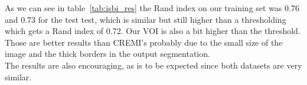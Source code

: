 As we can see in table~\ref{tab:isbi_res} the Rand index on our training set was 0.76 and 0.73 for the test test, 
which is similar but still higher than a thresholding which gets a Rand index of 0.72.
Our VOI is also a bit higher than the threshold.\\
Those are better results than CREMI's probably due to the small size of the
image and the thick borders in the output segmentation.\\ 

The results are also encouraging, as is to be expected since both datasets are
very similar.

